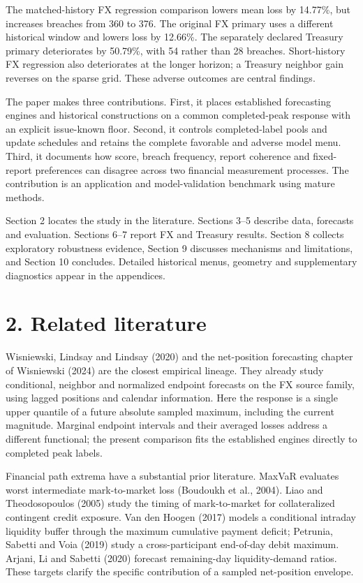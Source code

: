 \documentclass[10pt,a4paper]{article}
\begin{document}
The matched-history FX regression comparison lowers mean loss by 14.77\%, but increases breaches from 360 to 376. The original FX primary uses a different historical window and lowers loss by 12.66\%. The separately declared Treasury primary deteriorates by 50.79\%, with 54 rather than 28 breaches. Short-history FX regression also deteriorates at the longer horizon; a Treasury neighbor gain reverses on the sparse grid. These adverse outcomes are central findings.

The paper makes three contributions. First, it places established forecasting engines and historical constructions on a common completed-peak response with an explicit issue-known floor. Second, it controls completed-label pools and update schedules and retains the complete favorable and adverse model menu. Third, it documents how score, breach frequency, report coherence and fixed-report preferences can disagree across two financial measurement processes. The contribution is an application and model-validation benchmark using mature methods.

Section 2 locates the study in the literature. Sections 3--5 describe data, forecasts and evaluation. Sections 6--7 report FX and Treasury results. Section 8 collects exploratory robustness evidence, Section 9 discusses mechanisms and limitations, and Section 10 concludes. Detailed historical menus, geometry and supplementary diagnostics appear in the appendices.

\section*{2. Related literature}
Wisniewski, Lindsay and Lindsay (2020) and the net-position forecasting chapter of Wisniewski (2024) are the closest empirical lineage. They already study conditional, neighbor and normalized endpoint forecasts on the FX source family, using lagged positions and calendar information. Here the response is a single upper quantile of a future absolute sampled maximum, including the current magnitude. Marginal endpoint intervals and their averaged losses address a different functional; the present comparison fits the established engines directly to completed peak labels.

Financial path extrema have a substantial prior literature. MaxVaR evaluates worst intermediate mark-to-market loss (Boudoukh et al., 2004). Liao and Theodosopoulos (2005) study the timing of mark-to-market for collateralized contingent credit exposure. Van den Hoogen (2017) models a conditional intraday liquidity buffer through the maximum cumulative payment deficit; Petrunia, Sabetti and Voia (2019) study a cross-participant end-of-day debit maximum. Arjani, Li and Sabetti (2020) forecast remaining-day liquidity-demand ratios. These targets clarify the specific contribution of a sampled net-position envelope.
\end{document}
